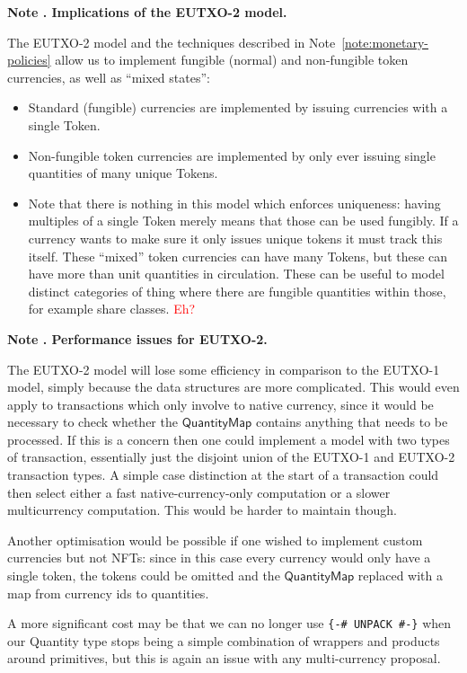 \documentclass[a4paper]{article}
\newcommand{\red}[1]{\textcolor{red}{#1}}
\newcounter{note}
\newcommand{\note}[1]{
  \bigskip
  \refstepcounter{note}
  \noindent\textbf{Note \thenote. #1}
}
\newcommand{\s}{\textsf}  %
\newcommand{\qtymap}{\ensuremath{\s{QuantityMap}}}
\begin{document}


\note{Implications of the EUTXO-2 model.}
\label{note:eutxo-2-implications}
The EUTXO-2 model and the techniques described in
Note~\ref{note:monetary-policies} allow us to implement fungible
(normal) and non-fungible token currencies, as well as ``mixed
states'':
\begin{itemize}
\item Standard (fungible) currencies are implemented by issuing
  currencies with a single \s{Token}.
\item Non-fungible token currencies are implemented by only ever
  issuing single quantities of many unique \s{Token}s.
\item Note that there is nothing in this model which enforces
  uniqueness: having multiples of a single \s{Token} merely means that
  those can be used fungibly. If a currency wants to make sure it only
  issues unique tokens it must track this itself.  These ``mixed'' token
  currencies can have many \s{Token}s, but these can have more than unit
  quantities in circulation.  These can be useful to model distinct
  categories of thing where there are fungible quantities within
  those, for example share classes. \red{Eh?}
\end{itemize}

\note{Performance issues for EUTXO-2.}
\label{note:eutxo-2-performance}
The EUTXO-2 model will lose some efficiency in comparison to the EUTXO-1
model, simply because the data structures are more complicated.  This
would even apply to transactions which only involve to native
currency, since it would be necessary to check whether the \qtymap{}
contains anything that needs to be processed.  If this is a concern
then one could implement a model with two types of transaction,
essentially just the disjoint union of the EUTXO-1 and EUTXO-2
transaction types. A simple case distinction at the start of a
transaction could then select either a fast native-currency-only
computation or a slower multicurrency computation.  This would be
harder to maintain though.

\smallskip  Another optimisation would be possible if one wished to
implement custom currencies but not NFTs: since in this case every
currency would only have a single token, the tokens could be omitted
and the $\qtymap$ replaced with a map from currency ids to quantities.

\smallskip A more significant cost may be that we can no longer use
\verb|{-# UNPACK #-}| when our Quantity type stops being a simple
combination of wrappers and products around primitives, but this is
again an issue with any multi-currency proposal.


\end{document}
